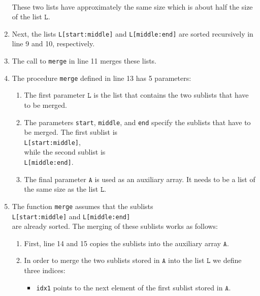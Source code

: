 \begin{enumerate}
      \\[0.2cm]
      These two lists have approximately the same size which is about half the size of the list $\texttt{L}$.
\item Next, the lists \texttt{L[start:middle]} and \texttt{L[middle:end]} are sorted
      recursively in line 9 and 10, respectively.
\item The call to \texttt{merge} in line 11 merges these lists.
\item The procedure \texttt{merge} defined in line 13 has 5 parameters: 
      \begin{enumerate}
      \item The first parameter $\texttt{L}$ is the list that contains the two sublists that have to be merged.
      \item The parameters \texttt{start}, \texttt{middle}, and \texttt{end} specify the sublists
            that have to be merged.  The first sublist is 
            \\[0.2cm]
            \hspace*{1.3cm} 
            \texttt{L[start:middle]}, 
            \\[0.2cm]
            while the second sublist is \\[0.2cm]
            \hspace*{1.3cm} 
            \texttt{L[middle:end]}. 
      \item The final parameter $\texttt{A}$ is used as an auxiliary array.  It needs to be a list of the
            same size as the list $\texttt{L}$.
      \end{enumerate}
\item The function \texttt{merge} assumes that the sublists 
      \\[0.2cm]
      \hspace*{1.3cm}
      \texttt{L[start:middle]} \quad and \quad \texttt{L[middle:end]} 
      \\[0.2cm]
      are already sorted.  The merging of these sublists works as follows:
      \begin{enumerate}
      \item First, line 14 and 15 copies the sublists into the auxiliary array $\texttt{A}$.
      \item In order to merge the two sublists stored in $\texttt{A}$ into the list $\texttt{L}$ we define
            three indices: 
            \begin{itemize}
            \item \texttt{idx1} points to the next element of the first sublist stored in $\texttt{A}$.

\end{itemize}
\end{enumerate}
\end{enumerate}
